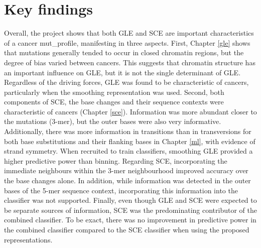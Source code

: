 \section{Key findings}
\label{intro:findings}
Overall, the project shows that both GLE and SCE are important characteristics of a cancer \gls{mut_profile}, manifesting in three aspects. First, Chapter \ref{gle} shows that mutations generally tended to occur in closed chromatin regions, but the degree of bias varied between cancers. This suggests that chromatin structure has an important influence on GLE, but it is not the single determinant of GLE. Regardless of the driving forces, GLE was found to be characteristic of cancers, particularly when the smoothing representation was used. Second, both components of SCE, the base changes and their sequence contexts were characteristic of cancers (Chapter \ref{sce}). Information was more abundant closer to the mutations (3-mer), but the outer bases were also very informative. Additionally, there was more information in \glspl{transition} than in \glspl{transversion} for both base substitutions and their flanking bases in Chapter \ref{ml}, with evidence of strand symmetry. When recruited to train classifiers, smoothing GLE provided a higher predictive power than binning. Regarding SCE, incorporating the immediate neighbours within the 3-mer neighbourhood improved accuracy over the base changes alone. In addition, while information was detected in the outer bases of the 5-mer sequence context, incorporating this information into the classifier was not supported. Finally, even though GLE and SCE were expected to be separate sources of information, SCE was the predominating contributor of the combined classifier. To be exact, there was no improvement in predictive power in the combined classifier compared to the SCE classifier when using the proposed representations.
